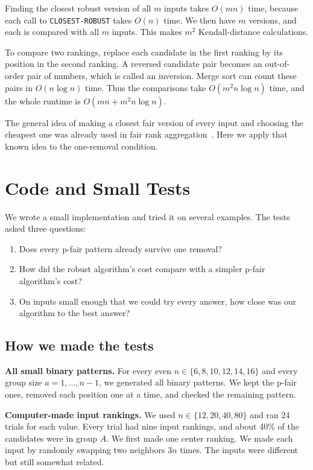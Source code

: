 \documentclass[11pt]{article}
\begin{document}
Finding the closest robust version of all $m$ inputs takes $O(mn)$ time,
because each call to \texttt{CLOSEST-ROBUST} takes $O(n)$ time.  We then have
$m$ versions, and each is compared with all $m$ inputs.  This makes $m^2$
Kendall-distance calculations.

To compare two rankings, replace each candidate in the first ranking by its
position in the second ranking.  A reversed candidate pair becomes an
out-of-order pair of numbers, which is called an inversion.  Merge sort can
count these pairs in $O(n\log n)$ time.  Thus the comparisons take
$O(m^2n\log n)$ time, and the whole runtime is
$O(mn+m^2n\log n)$.

The general idea of making a closest fair version of every input and choosing
the cheapest one was already used in fair rank
aggregation~\cite{wei2022,chakraborty2025}.  Here we apply that known idea to
the one-removal condition.

\section{Code and Small Tests}

We wrote a small implementation and tried it on several examples.  The tests
asked three questions:

\begin{enumerate}
  \item Does every p-fair pattern already survive one removal?
  \item How did the robust algorithm's cost compare with a simpler p-fair
        algorithm's cost?
  \item On inputs small enough that we could try every answer, how close was
        our algorithm to the best answer?
\end{enumerate}

\subsection{How we made the tests}

\noindent\textbf{All small binary patterns.}
For every even $n\in\{6,8,10,12,14,16\}$ and every group size
$a=1,\ldots,n-1$, we generated all binary patterns.  We kept the p-fair ones,
removed each position one at a time, and checked the remaining pattern.

\medskip
\noindent\textbf{Computer-made input rankings.}
We used $n\in\{12,20,40,80\}$ and ran 24 trials for each value.  Every trial
had nine input rankings, and about 40\% of the candidates were in group $A$.
We first made one center ranking.  We made each input by randomly swapping two
neighbors $3n$ times.  The inputs were different but still somewhat related.
\end{document}
